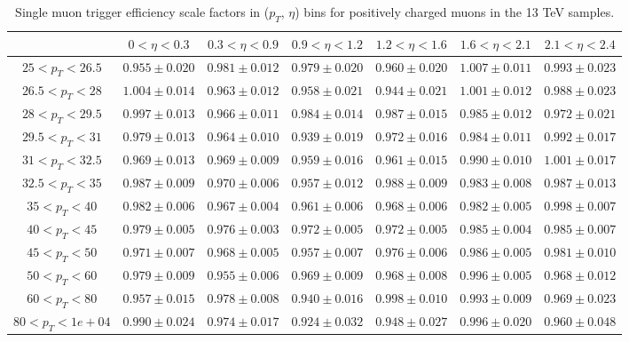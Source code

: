 \begin{table}
\begin{center}
{\begin{tabular}{ccccccc}
\hline
& $0< \eta<0.3$ & $0.3< \eta<0.9$ & $0.9< \eta<1.2$ & $1.2< \eta<1.6$ & $1.6< \eta<2.1$ & $2.1< \eta<2.4$ \\
\hline \hline
$25<p_{T}<26.5$ & $0.955 \pm 0.020$ & $0.981 \pm 0.012$ & $0.979 \pm 0.020$ & $0.960 \pm 0.020$ & $1.007 \pm 0.011$ & $0.993 \pm 0.023$  \\
$26.5<p_{T}<28$ & $1.004 \pm 0.014$ & $0.963 \pm 0.012$ & $0.958 \pm 0.021$ & $0.944 \pm 0.021$ & $1.001 \pm 0.012$ & $0.988 \pm 0.023$  \\
$28<p_{T}<29.5$ & $0.997 \pm 0.013$ & $0.966 \pm 0.011$ & $0.984 \pm 0.014$ & $0.987 \pm 0.015$ & $0.985 \pm 0.012$ & $0.972 \pm 0.021$  \\
$29.5<p_{T}<31$ & $0.979 \pm 0.013$ & $0.964 \pm 0.010$ & $0.939 \pm 0.019$ & $0.972 \pm 0.016$ & $0.984 \pm 0.011$ & $0.992 \pm 0.017$  \\
$31<p_{T}<32.5$ & $0.969 \pm 0.013$ & $0.969 \pm 0.009$ & $0.959 \pm 0.016$ & $0.961 \pm 0.015$ & $0.990 \pm 0.010$ & $1.001 \pm 0.017$  \\
$32.5<p_{T}<35$ & $0.987 \pm 0.009$ & $0.970 \pm 0.006$ & $0.957 \pm 0.012$ & $0.988 \pm 0.009$ & $0.983 \pm 0.008$ & $0.987 \pm 0.013$  \\
$35<p_{T}<40$ & $0.982 \pm 0.006$ & $0.967 \pm 0.004$ & $0.961 \pm 0.006$ & $0.968 \pm 0.006$ & $0.982 \pm 0.005$ & $0.998 \pm 0.007$  \\
$40<p_{T}<45$ & $0.979 \pm 0.005$ & $0.976 \pm 0.003$ & $0.972 \pm 0.005$ & $0.972 \pm 0.005$ & $0.985 \pm 0.004$ & $0.985 \pm 0.007$  \\
$45<p_{T}<50$ & $0.971 \pm 0.007$ & $0.968 \pm 0.005$ & $0.957 \pm 0.007$ & $0.976 \pm 0.006$ & $0.986 \pm 0.005$ & $0.981 \pm 0.010$  \\
$50<p_{T}<60$ & $0.979 \pm 0.009$ & $0.955 \pm 0.006$ & $0.969 \pm 0.009$ & $0.968 \pm 0.008$ & $0.996 \pm 0.005$ & $0.968 \pm 0.012$  \\
$60<p_{T}<80$ & $0.957 \pm 0.015$ & $0.978 \pm 0.008$ & $0.940 \pm 0.016$ & $0.998 \pm 0.010$ & $0.993 \pm 0.009$ & $0.969 \pm 0.023$  \\
$80<p_{T}<1e+04$ & $0.990 \pm 0.024$ & $0.974 \pm 0.017$ & $0.924 \pm 0.032$ & $0.948 \pm 0.027$ & $0.996 \pm 0.020$ & $0.960 \pm 0.048$  \\
\hline
\end{tabular}}
\end{center}
\caption{Single muon trigger efficiency scale factors in ($p_T$, $\eta$) bins for positively charged muons in the 13 TeV samples.}
\label{tab:Eff:mu:13TeV:HLT:pos}
\end{table}
